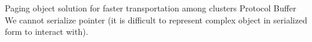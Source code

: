 Paging object solution for faster transportation among clusters
Protocol Buffer 
We cannot serialize pointer (it is difficult to represent complex object in serialized form to interact with).
